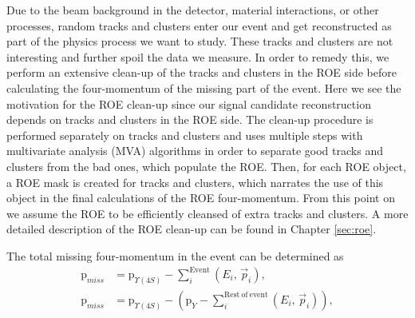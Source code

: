 Due to the beam background in the detector, material interactions, or other processes, random tracks and clusters enter our event and get reconstructed as part of the physics process we want to study. These tracks and clusters are not interesting and further spoil the data we measure. In order to remedy this, we perform an extensive clean-up of the tracks and clusters in the ROE side before calculating the four-momentum of the missing part of the event. Here we see the motivation for the ROE clean-up since our signal candidate reconstruction depends on tracks and clusters in the ROE side. The clean-up procedure is performed separately on tracks and clusters and uses multiple steps with multivariate analysis (MVA) algorithms in order to separate good tracks and clusters from the bad ones, which populate the ROE. Then, for each ROE object, a ROE mask is created for tracks and clusters, which narrates the use of this object in the final calculations of the ROE four-momentum. From this point on we assume the ROE to be efficiently cleansed of extra tracks and clusters. A more detailed description of the ROE clean-up can be found in Chapter \ref{sec:roe}. 

The total missing four-momentum in the event can be determined as
\begin{align}
\mathrm{p}_{miss} &= \mathrm{p}_{\Upsilon(4S)} - \sum_i^{\mathrm{Event}}\left(E_i,\,\vec{p}_i \right),\\
\label{eq:ROEloop}
\mathrm{p}_{miss} &= \mathrm{p}_{\Upsilon(4S)} - \left(\mathrm{p}_{Y} -\sum_i^{\mathrm{Rest~of~event}}\left(E_i,\,\vec{p}_i \right)\right),
\end{align}

